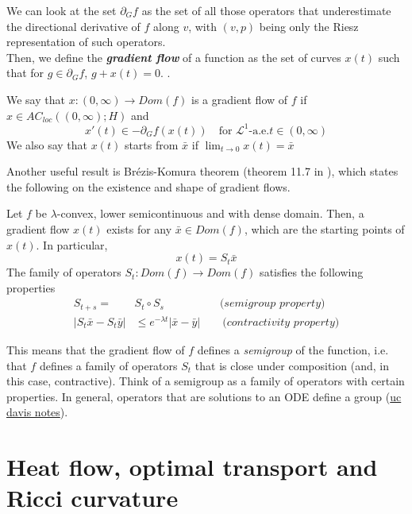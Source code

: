 \documentclass[a4paper,12pt,reqno]{amsbook}
\theoremstyle{definition} %
\newcommand{\1}{\mathbbm{1}}
\newcommand{\mL}{\mathscr{L}}
\theoremstyle{plain}
\theoremstyle{remark}
\begin{document}
{We can look at the set $\partial_G f$ as the set of all those operators that underestimate the directional derivative of $f$ along $v$, with $(v,p)$ being only the Riesz representation of such operators. 
\\

Then, we define the \textbf{\emph{gradient flow}} of a function as the set of curves $x(t)$ such that for $g \in \partial_Gf$, $g + x(t) = 0$. .

\begin{definition}
    We say that $x:(0, \infty) \to Dom(f)$ is a gradient flow of $f$ if $x \in AC_{loc}((0,\infty);H)$ and
        \begin{equation}\label{eq: gradflow}
        x'(t) \in -\partial_G f(x(t)) \quad\text{for }\mL^1\text{-a.e.} t\in (0,\infty)
    \end{equation}
    We also say that $x(t)$ starts from $\bar x$ if $\lim_{t\to 0}x(t)=\bar x$
\end{definition}

Another useful result is Brézis-Komura theorem (theorem 11.7 in \cite{brue}), which states the following on the existence and shape of gradient flows.  
\begin{theorem}\label{thm: gradflow}
    Let $f$ be $\lambda$-convex, lower semicontinuous and with dense domain. Then, a gradient flow $x(t)$
    exists for any $\bar x\in Dom(f)$, which are the starting points of $x(t)$. In particular,
    \[
    x(t) = S_t \bar x
    \]
    The family of operators $S_t:Dom(f) \to Dom(f)$ satisfies the following properties
    \begin{align*}
        S_{t+s}=&S_t\circ S_s \quad\quad\quad\quad\quad \textit{(semigroup property)}\\
        |S_t \bar x - S_t \bar y | &\le e^{-\lambda t}|\bar x - \bar y| \quad\quad \textit{(contractivity property)}
    \end{align*}
\end{theorem}

This means that the gradient flow of $f$ defines a \textit{semigroup} of the function, i.e. that $f$ defines a family of operators $S_t$ that is close under composition (and, in this case, contractive). Think of a semigroup as a family of operators with certain properties. In general, operators that are solutions to an ODE define a group (\href{https://www.math.ucdavis.edu/~hunter/m218a_09/ch5}{uc davis notes}). 

\newpage
\chapter{Heat flow, optimal transport and Ricci curvature}
}
\end{document}
